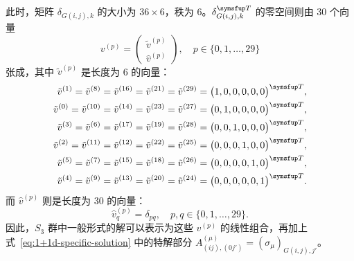 此时，矩阵 $\delta_{G(i,j),k}$ 的大小为 $36\times6$，秩为 6。$\delta_{G(i,j),k}^\trans$ 的零空间则由 30 个向量
\begin{equation}
  v^{(p)} = \begin{pmatrix}
    \tilde{v}^{(p)} \\ \hat{v}^{(p)}
  \end{pmatrix}, \quad p \in \{0, 1, \dots, 29\}
\end{equation}
张成，其中 $\tilde{v}^{(p)}$ 是长度为 6 的向量：
\begin{equation}
  \def\V#1{\tilde{v}^{(#1)}}
  \begin{aligned}
    \V{1} = \V{8}  = \V{16} = \V{21} = \V{29} &= \bigl( 1, 0, 0, 0, 0, 0 \bigr)^\trans, \\
    \V{0} = \V{10} = \V{14} = \V{23} = \V{27} &= \bigl( 0, 1, 0, 0, 0, 0 \bigr)^\trans, \\
    \V{3} = \V{6}  = \V{17} = \V{19} = \V{28} &= \bigl( 0, 0, 1, 0, 0, 0 \bigr)^\trans, \\
    \V{2} = \V{11} = \V{12} = \V{22} = \V{25} &= \bigl( 0, 0, 0, 1, 0, 0 \bigr)^\trans, \\
    \V{5} = \V{7}  = \V{15} = \V{18} = \V{26} &= \bigl( 0, 0, 0, 0, 1, 0 \bigr)^\trans, \\
    \V{4} = \V{9}  = \V{13} = \V{20} = \V{24} &= \bigl( 0, 0, 0, 0, 0, 1 \bigr)^\trans.
  \end{aligned}
\end{equation}
而 $\hat{v}^{(p)}$ 则是长度为 30 的向量：
\begin{equation}
  \hat{v}^{(p)}_q = \delta_{pq}, \quad p,q \in \{0, 1, \dots, 29\}.
\end{equation}
因此，$S_3$ 群中一般形式的解可以表示为这些 $v^{(p)}$ 的线性组合，再加上式~\eqref{eq:1+1d-specific-solution} 中的特解部分 $A^{(\mu)}_{(ij),(0j')}=(\sigma_\mu)_{G(i,j),j'}$。

